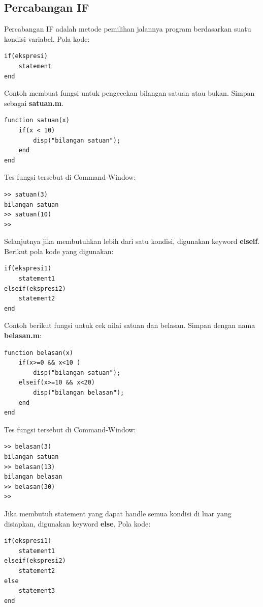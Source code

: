 \documentclass[12pt]{book}
\begin{document}
	\subsection{Percabangan IF}

	Percabangan IF adalah metode pemilihan jalannya program berdasarkan suatu kondisi variabel.
	Pola kode:
	\begin{verbatim}
if(ekspresi)
	statement
end
	\end{verbatim}

	Contoh membuat fungsi untuk pengecekan bilangan satuan atau bukan.
	Simpan sebagai \textbf{satuan.m}.
	\begin{verbatim}
function satuan(x)
	if(x < 10)
		disp("bilangan satuan");
	end
end
	\end{verbatim}

	Tes fungsi tersebut di Command-Window:
	\begin{verbatim}
>> satuan(3)
bilangan satuan
>> satuan(10)
>>
	\end{verbatim}

	Selanjutnya jika membutuhkan lebih dari satu kondisi, digunakan keyword \textbf{elseif}.
	Berikut pola kode yang digunakan:
	\begin{verbatim}
if(ekspresi1)
	statement1
elseif(ekspresi2)
	statement2
end
	\end{verbatim}

	Contoh berikut fungsi untuk cek nilai satuan dan belasan.
	Simpan dengan nama \textbf{belasan.m}:
	\begin{verbatim}
function belasan(x)
	if(x>=0 && x<10 )
		disp("bilangan satuan");
	elseif(x>=10 && x<20)
		disp("bilangan belasan");
	end
end
	\end{verbatim}

	Tes fungsi tersebut di Command-Window:
	\begin{verbatim}
>> belasan(3)
bilangan satuan
>> belasan(13)
bilangan belasan
>> belasan(30)
>>
	\end{verbatim}

	Jika membutuh statement yang dapat handle semua kondisi di luar yang disiapkan, digunakan keyword \textbf{else}.
	Pola kode:
	\begin{verbatim}
if(ekspresi1)
	statement1
elseif(ekspresi2)
	statement2
else
	statement3
end
	\end{verbatim}
\end{document}
